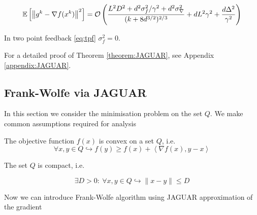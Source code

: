 \begin{theorem}
            \begin{equation*}
                \mathbb{E}\left[ \left\| g^k - \nabla f(x^k) \right\|^2 \right] 
                =
                \mathcal{O} \left(\frac{L^2 D^2 + d^2 \sigma_f^2/ \gamma^2 + d^2 \sigma_{\nabla}^2}{(k + 8d^{3/2})^{2/3}} 
                +
                d L^2 \gamma^2 + \frac{d \Delta^2}{\gamma^2} \right)
            \end{equation*}
    
            In two point feedback \eqref{eq:tpf} $\sigma^2_f = 0$.
            
        \end{theorem}
    
        For a detailed proof of Theorem \ref{theorem:JAGUAR}, see Appendix \ref{appendix:JAGUAR}. 

    \subsection{Frank-Wolfe via JAGUAR}
    \label{sect:FW_via_JAGUAR}

        In this section we consider the minimisation problem on the set $Q$. We make common assumptions required for analysis
    
        \begin{assumption}[Convex]\label{ass:conv}
            The objective function $f(x)$ is convex on a set $Q$, i.e. 
            \begin{equation*}
                \forall x, y \in Q \hookrightarrow f(y) \geq f(x) + \left<\nabla f(x), y - x\right>
            \end{equation*}
        \end{assumption}
    
        \begin{assumption}\label{ass:compact}
            The set $Q$ is compact, i.e. 
    
            \begin{equation*}
                \exists D > 0 :~ \forall x, y \in Q \hookrightarrow \|x - y\| \leq D
            \end{equation*}
        \end{assumption}
    
        Now we can introduce Frank-Wolfe algorithm using JAGUAR approximation of the gradient
    
